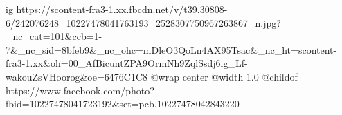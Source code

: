  
 
 
 
 

\ifcmt
  ig https://scontent-fra3-1.xx.fbcdn.net/v/t39.30808-6/242076248_10227478041763193_2528307750967263867_n.jpg?_nc_cat=101&ccb=1-7&_nc_sid=8bfeb9&_nc_ohc=mDleO3QoLn4AX95Tsac&_nc_ht=scontent-fra3-1.xx&oh=00_AfBicuntZPA9OrmNh9ZqlSsdj6ig_Lf-wakouZsVHoorog&oe=6476C1C8
  @wrap center
  @width 1.0
  @childof https://www.facebook.com/photo?fbid=10227478041723192&set=pcb.10227478042843220
\fi
